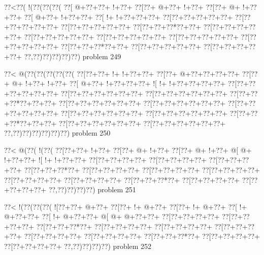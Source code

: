 \vbox{\vbox{\goo
\0??<\0??(\- !(\0??(\0??(\0??(
\0??[\- @+\0??+\0??+\- !+\0??+
\0??[\0??+\- @+\0??+\- !+\0??+
\0??[\0??+\- @+\- !+\0??+\0??+
\0??[\- @+\0??+\- !+\0??+\0??+
\0??[\- !+\- !+\0??+\0??+\0??+
\0??[\0??+\0??+\0??+\0??+\0??+
\0??[\0??+\0??+\0??+\0??+\0??+
\0??[\0??+\0??+\0??+\0??+\0??+
\0??[\0??+\0??+\0??*\0??+\0??+
\0??[\0??+\0??+\0??+\0??+\0??+
\0??[\0??+\0??+\0??+\0??+\0??+
\0??[\0??+\0??+\0??+\0??+\0??+
\0??[\0??+\0??+\0??+\0??+\0??+
\0??[\0??+\0??+\0??+\0??+\0??+
\0??[\0??+\0??+\0??*\0??+\0??+
\0??[\0??+\0??+\0??+\0??+\0??+
\0??[\0??+\0??+\0??+\0??+\0??+
\0??,\0??)\0??)\0??)\0??)\0??)
}
\hfil problem 249\hfil\break
}

\vbox{\vbox{\goo
\0??<\- @(\0??(\0??(\0??(\0??(\0??(
\0??[\0??+\0??+\- !+\- !+\0??+\0??+
\0??[\0??+\- @+\0??+\0??+\0??+\0??+
\0??[\0??+\- @+\- !+\0??+\- !+\0??+
\0??[\- @+\0??+\- !+\0??+\0??+\0??+
\- ![\- !+\- !+\0??+\0??+\0??+\0??+
\0??[\0??+\0??+\0??+\0??+\0??+\0??+
\0??[\0??+\0??+\0??+\0??+\0??+\0??+
\0??[\0??+\0??+\0??+\0??+\0??+\0??+
\0??[\0??+\0??+\0??*\0??+\0??+\0??+
\0??[\0??+\0??+\0??+\0??+\0??+\0??+
\0??[\0??+\0??+\0??+\0??+\0??+\0??+
\0??[\0??+\0??+\0??+\0??+\0??+\0??+
\0??[\0??+\0??+\0??+\0??+\0??+\0??+
\0??[\0??+\0??+\0??+\0??+\0??+\0??+
\0??[\0??+\0??+\0??*\0??+\0??+\0??+
\0??[\0??+\0??+\0??+\0??+\0??+\0??+
\0??[\0??+\0??+\0??+\0??+\0??+\0??+
\0??,\0??)\0??)\0??)\0??)\0??)\0??)
}
\hfil problem 250\hfil\break
}

\vbox{\vbox{\goo
\0??<\- @(\0??(\- !(\0??(
\0??[\0??+\0??+\- !+\0??+
\0??[\0??+\- @+\- !+\0??+
\0??[\0??+\- @+\- !+\0??+
\- @[\- @+\- !+\0??+\0??+
\- ![\- !+\- !+\0??+\0??+
\0??[\0??+\0??+\0??+\0??+
\0??[\0??+\0??+\0??+\0??+
\0??[\0??+\0??+\0??+\0??+
\0??[\0??+\0??+\0??*\0??+
\0??[\0??+\0??+\0??+\0??+
\0??[\0??+\0??+\0??+\0??+
\0??[\0??+\0??+\0??+\0??+
\0??[\0??+\0??+\0??+\0??+
\0??[\0??+\0??+\0??+\0??+
\0??[\0??+\0??+\0??*\0??+
\0??[\0??+\0??+\0??+\0??+
\0??[\0??+\0??+\0??+\0??+
\0??,\0??)\0??)\0??)\0??)
}
\hfil problem 251\hfil\break
}

\vbox{\vbox{\goo
\0??<\- !(\0??(\0??(\0??(
\- ![\0??+\0??+\- @+\0??+
\0??[\0??+\- !+\- @+\0??+
\0??[\0??+\- !+\- @+\0??+
\0??[\- !+\- @+\0??+\0??+
\0??[\- !+\- @+\0??+\0??+
\- @[\- @+\- @+\0??+\0??+
\0??[\0??+\0??+\0??+\0??+
\0??[\0??+\0??+\0??+\0??+
\0??[\0??+\0??+\0??*\0??+
\0??[\0??+\0??+\0??+\0??+
\0??[\0??+\0??+\0??+\0??+
\0??[\0??+\0??+\0??+\0??+
\0??[\0??+\0??+\0??+\0??+
\0??[\0??+\0??+\0??+\0??+
\0??[\0??+\0??+\0??*\0??+
\0??[\0??+\0??+\0??+\0??+
\0??[\0??+\0??+\0??+\0??+
\0??,\0??)\0??)\0??)\0??)
}
\hfil problem 252\hfil\break
}

